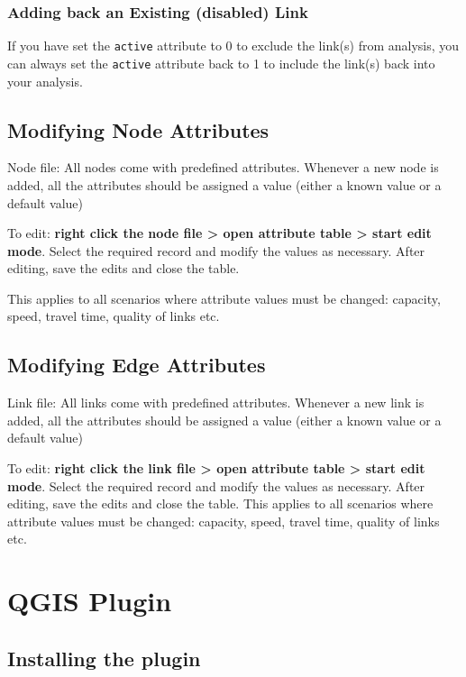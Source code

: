\documentclass[
]{book}
\begin{document}
\section{Adding back an Existing (disabled) Link}\label{adding-back-an-existing-disabled-link}

If you have set the \texttt{active} attribute to 0 to exclude the link(s) from analysis, you can always set the \texttt{active} attribute back to 1 to include the link(s) back into your analysis.

\chapter{Modifying Node Attributes}\label{modifying-node-attributes}

Node file: All nodes come with predefined attributes. Whenever a new node is added, all the attributes should be assigned a value (either a known value or a default value)

To edit: \textbf{right click the node file \textgreater{} open attribute table \textgreater{} start edit mode}. Select the required record and modify the values as necessary. After editing, save the edits and close the table.

This applies to all scenarios where attribute values must be changed: capacity, speed, travel time, quality of links etc.

\chapter{Modifying Edge Attributes}\label{modifying-edge-attributes}

Link file: All links come with predefined attributes. Whenever a new link is added, all the attributes should be assigned a value (either a known value or a default value)

To edit: \textbf{right click the link file \textgreater{} open attribute table \textgreater{} start edit mode}. Select the required record and modify the values as necessary. After editing, save the edits and close the table. This applies to all scenarios where attribute values must be changed: capacity, speed, travel time, quality of links etc.

\part{QGIS Plugin}\label{part-qgis-plugin}

\chapter{Installing the plugin}\label{installing-the-plugin}
\end{document}
